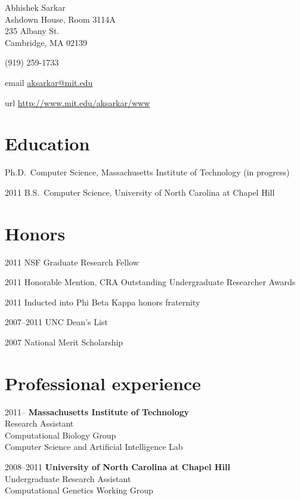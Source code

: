\documentclass{article}
\begin{document}
{\LARGE Abhishek Sarkar\vspace{1em}}\\
Ashdown House, Room 3114A\\
235 Albany St.\\
Cambridge, MA 02139\vspace{1em}

(919) 259-1733\vspace{1em}

\begin{hdesc}
\item[email] \url{aksarkar@mit.edu}
\item[url] \url{http://www.mit.edu/aksarkar/www}
\end{hdesc}

\section*{Education}
\begin{hdesc}
\item[] Ph.D.\ Computer Science, Massachusetts Institute of Technology (in
  progress)
\item[2011] B.S.\ Computer Science, University of North Carolina at
  Chapel Hill
\end{hdesc}

\section*{Honors}
\begin{hdesc}
\item[2011] NSF Graduate Research Fellow
\item[2011] Honorable Mention, CRA Outstanding Undergraduate Researcher Awards
\item[2011] Inducted into Phi Beta Kappa honors fraternity
\item[2007--2011] UNC Dean's List
\item[2007] National Merit Scholarship
\end{hdesc}

\section*{Professional experience}
\begin{hdesc}[itemsep=1em]
\item[2011--] \textbf{Massachusetts Institute of Technology}\\
Research Assistant\\
Computational Biology Group\\
Computer Science and Artificial Intelligence Lab

\item[2008--2011] \textbf{University of North Carolina at Chapel Hill}\\
Undergraduate Research Assistant\\
Computational Genetics Working Group
\end{hdesc}
\end{document}
